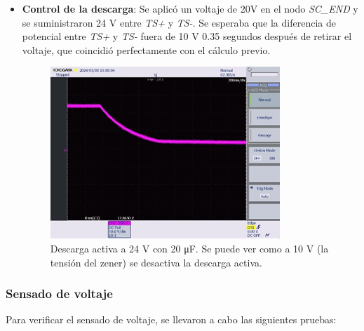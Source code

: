 \begin{itemize}
	\item \textbf{Control de la descarga}: Se aplicó un voltaje de 20V en el nodo \textit{SC\_END} y se suministraron 24 V entre \textit{TS+} y \textit{TS-}. Se esperaba que la diferencia de potencial entre \textit{TS+} y \textit{TS-} fuera de 10 V 0.35 segundos después de retirar el voltaje, que coincidió perfectamente con el cálculo previo.
	\begin{figure}[H]
		\centering
		\includegraphics[width=0.7\linewidth]{fig/discharge2}
		\caption{Descarga activa a 24 V con 20 \unit{\micro\farad}. Se puede ver como a 10 V (la tensión del zener) se desactiva la descarga activa.}
	\end{figure}
\end{itemize}
	
	
\subsubsection{Sensado de voltaje}

Para verificar el sensado de voltaje, se llevaron a cabo las siguientes pruebas:

